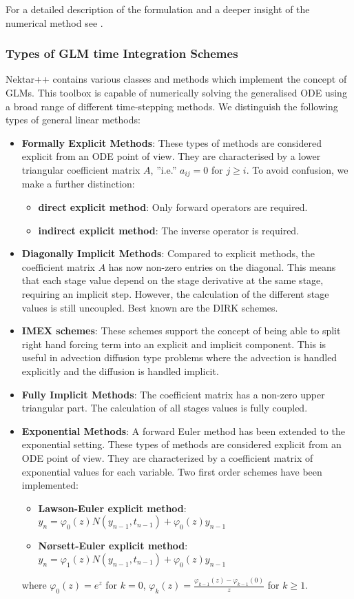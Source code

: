 For a detailed description of the formulation and a deeper insight of the
numerical method see \cite{Vostime}.

\subsubsection{Types of GLM time Integration Schemes}
Nektar++ contains various classes and methods which implement the
concept of GLMs. This toolbox is capable of numerically solving the
generalised ODE using a broad range of different time-stepping
methods. We distinguish the following types of general linear methods:
\begin{itemize}
\item \textbf{Formally Explicit Methods}: These types of methods are
  considered explicit from an ODE point of view. They are
  characterised by a lower triangular coefficient matrix $A$, ''i.e.''
  $a_{ij} = 0$ for $j\geq i$. To avoid confusion, we make a further
  distinction:
  \begin{itemize}
    \item \textbf{direct explicit method}: Only forward operators are
      required.
    \item \textbf{indirect explicit method}: The inverse operator is
      required.
  \end{itemize}
  \item \textbf{Diagonally Implicit Methods}: Compared to explicit
    methods, the coefficient matrix $A$ has now non-zero entries on
    the diagonal.  This means that each stage value depend on the
    stage derivative at the same stage, requiring an implicit
    step. However, the calculation of the different stage values is
    still uncoupled. Best known are the DIRK schemes.
  \item \textbf{IMEX schemes}: These schemes support the concept of
    being able to split right hand forcing term into an explicit and
    implicit component. This is useful in advection diffusion type
    problems where the advection is handled explicitly and the
    diffusion is handled implicit.
  \item \textbf{Fully Implicit Methods}: The coefficient matrix has a
    non-zero upper triangular part. The calculation of all stages
    values is fully coupled.
  \item \textbf{Exponential Methods}: A forward Euler method has been
    extended to the exponential setting. These types of methods are
    considered explicit from an ODE point of view. They are
    characterized by a coefficient matrix of exponential values for
    each variable. Two first order schemes have been implemented:
  \begin{itemize}
    \item \textbf{Lawson-Euler explicit method}: $y_n =
      \varphi_0(z)N(y_{n-1},t_{n-1}) + \varphi_0(z)y_{n-1}$
    \item \textbf{N{\o}rsett-Euler explicit method}: $y_n =
      \varphi_1(z)N(y_{n-1},t_{n-1}) + \varphi_0(z)y_{n-1}$
  \end{itemize}
  where $\varphi_0(z) = e^{z}$ for $k = 0$, $\varphi_{k}(z) =
  \frac{\varphi_{k-1}(z) - \varphi_{k-1}(0)}{z}$ for $k \geq 1$.
  \end{itemize}
